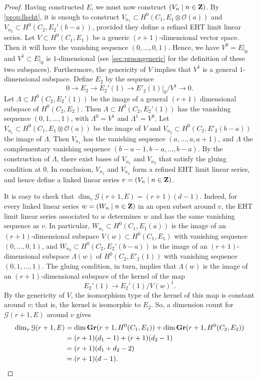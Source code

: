 \documentclass[11pt,reqno]{amsart}
\theoremstyle{plain}
\theoremstyle{definition}
\theoremstyle{remark}
\numberwithin{equation}{section}
\renewcommand{\to}{{\longrightarrow}}
\numberwithin{equation}{section}
\renewcommand{\O}{\mathcal O}
\begin{document}
\begin{proof}
  Having constructed $E$, we must now construct $(V_n \mid n \in {\bf Z})$.
  By \autoref{prop:llseht}, it is enough to construct $V_{n_1} \subset H^0(C_1, E_1 \otimes \O(a))$ and $V_{n_2} \subset H^0(C_2, E_2'(b-a))$, provided they define a refined EHT limit linear series.
  Let $V \subset H^0(C_1, E_1)$ be a generic $(r+1)$-dimensional vector space.
  Then it will have the vanishing sequence $(0, \dots, 0, 1)$.
  Hence, we have $V^0 = E|_0$ and $V^1 \subset E|_0$ is $1$-dimensional (see \autoref{sec:prnongeneric} for the definition of these two subspaces).
  Furthermore, the genericity of $V$ implies that $V^1$ is a general $1$-dimensional subspace.
  Define $E_2$ by the sequence
  \[ 0 \to E_2 \to E_2'(1) \to E'_2(1)|_0 / V^1 \to 0.\]
  Let $\Lambda \subset H^0(C_2, E_2'(1))$ be the image of a general $(r+1)$ dimensional subspace of $H^0(C_2, E_2)$.
  Then $\Lambda \subset H^0(C_2, E_2'(1))$ has the vanishing sequence $(0, 1, \dots, 1)$, with $\Lambda^0 = V^1$ and $\Lambda^1 = V^0$.
  Let $V_{n_1} \subset H^0(C_1, E_1 \otimes \O(a))$ be the image of $V$ and $V_{n_2} \subset H^0(C_2,E'_2(b-a))$ the image of $\Lambda$.
  Then $V_{n_1}$ has the vanishing sequence $(a, \dots, a, a+1)$, and $\Lambda$ the complementary vanishing sequence $(b-a-1, b-a, \dots, b-a)$.
  By the construction of $\Lambda$, there exist bases of $V_{n_1}$ and $V_{n_2}$ that satisfy the gluing condition at $0$.
  In conclusion, $V_{n_1}$ and $V_{n_2}$ form a refined EHT limit linear series, and hence define a linked linear series $v = (V_n \mid n \in {\bf Z})$.

  It is easy to check that $\dim_v \mathcal G(r+1, E) = (r+1)(d-1)$.
  Indeed, for every linked linear series $w = (W_n \mid n \in {\bf Z})$ in an open subset around $v$, the EHT limit linear series associated to $w$ determines $w$ and has the same vanishing sequence as $v$.
  In particular, $W_{n_1} \subset H^0(C_1, E_1(a))$ is the image of an $(r+1)$-dimensional subspace $V(w) \subset H^0(C_1, E_1)$ with vanishing sequence $(0, \dots, 0, 1)$, and $W_{n_2} \subset H^0(C_2, E_2'(b-a))$ is the image of an $(r+1)$-dimensional subspace $\Lambda(w)$ of $H^0(C_2, E'_2(1))$ with vanishing sequence $(0,1,\dots,1)$.
  The gluing condition, in turn, implies that $\Lambda(w)$ is the image of an $(r+1)$-dimensional subspace of the kernel of the map
  \[ E_2'(1) \to E_2'(1)/V(w)^1.\]
  By the genericity of $V$, the isomorphism type of the kernel of this map is constant around $v$; that is, the kernel is isomorphic to $E_2$.
  So, a dimension count for $\mathcal G(r+1, E)$ around $v$ gives
  \begin{align*}
    \dim_v \mathcal G(r+1, E) &= \dim {\bf Gr}(r+1, H^0(C_1, E_1)) + \dim {\bf Gr}(r+1, H^0(C_2, E_2))\\
                              &= (r+1)(d_1-1) + (r+1)(d_2-1)\\
                              &= (r+1)(d_1+d_2-2)\\
                              &= (r+1)(d-1).\\
  \end{align*}


\end{proof}
\end{document}
